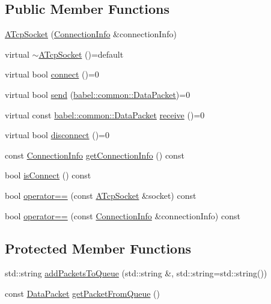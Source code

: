 \subsection*{Public Member Functions}
\begin{DoxyCompactItemize}
\item 
\mbox{\hyperlink{classbabel_1_1common_1_1_a_tcp_socket_afc97013cfafa24251d58cd82c39cb716}{A\+Tcp\+Socket}} (\mbox{\hyperlink{classbabel_1_1common_1_1_connection_info}{Connection\+Info}} \&connection\+Info)
\item 
virtual \mbox{\hyperlink{classbabel_1_1common_1_1_a_tcp_socket_a1030e55170e3c533442588a71370eb0a}{$\sim$\+A\+Tcp\+Socket}} ()=default
\item 
virtual bool \mbox{\hyperlink{classbabel_1_1common_1_1_a_tcp_socket_ae049c9a079ad9e4f0ddfc4b2282e2493}{connect}} ()=0
\item 
virtual bool \mbox{\hyperlink{classbabel_1_1common_1_1_a_tcp_socket_a4c6b77b93cedcb874caa0a9cee6cad36}{send}} (\mbox{\hyperlink{classbabel_1_1common_1_1_data_packet}{babel\+::common\+::\+Data\+Packet}})=0
\item 
virtual const \mbox{\hyperlink{classbabel_1_1common_1_1_data_packet}{babel\+::common\+::\+Data\+Packet}} \mbox{\hyperlink{classbabel_1_1common_1_1_a_tcp_socket_a8bfec8f1b34e75429f9e912ed7108936}{receive}} ()=0
\item 
virtual bool \mbox{\hyperlink{classbabel_1_1common_1_1_a_tcp_socket_a8aa4d31dccc7314d5866410846d83159}{disconnect}} ()=0
\item 
const \mbox{\hyperlink{classbabel_1_1common_1_1_connection_info}{Connection\+Info}} \mbox{\hyperlink{classbabel_1_1common_1_1_a_tcp_socket_a5e834bf865edebb37d8018a56668f3bf}{get\+Connection\+Info}} () const
\item 
bool \mbox{\hyperlink{classbabel_1_1common_1_1_a_tcp_socket_af253a6e358f04cdfe2daf19244f6d614}{is\+Connect}} () const
\item 
bool \mbox{\hyperlink{classbabel_1_1common_1_1_a_tcp_socket_ae6434c16ae66afbcf46e5253da01024c}{operator==}} (const \mbox{\hyperlink{classbabel_1_1common_1_1_a_tcp_socket}{A\+Tcp\+Socket}} \&socket) const
\item 
bool \mbox{\hyperlink{classbabel_1_1common_1_1_a_tcp_socket_acc33c4655f867911fe8593464818fd76}{operator==}} (const \mbox{\hyperlink{classbabel_1_1common_1_1_connection_info}{Connection\+Info}} \&connection\+Info) const
\end{DoxyCompactItemize}
\subsection*{Protected Member Functions}
\begin{DoxyCompactItemize}
\item 
std\+::string \mbox{\hyperlink{classbabel_1_1common_1_1_a_tcp_socket_ad92a444e56b590684b28978319a26b0f}{add\+Packets\+To\+Queue}} (std\+::string \&, std\+::string=std\+::string())
\item 
const \mbox{\hyperlink{classbabel_1_1common_1_1_data_packet}{Data\+Packet}} \mbox{\hyperlink{classbabel_1_1common_1_1_a_tcp_socket_a2e057c8d9e01aba599e4314a93a5d238}{get\+Packet\+From\+Queue}} ()
\end{DoxyCompactItemize}
